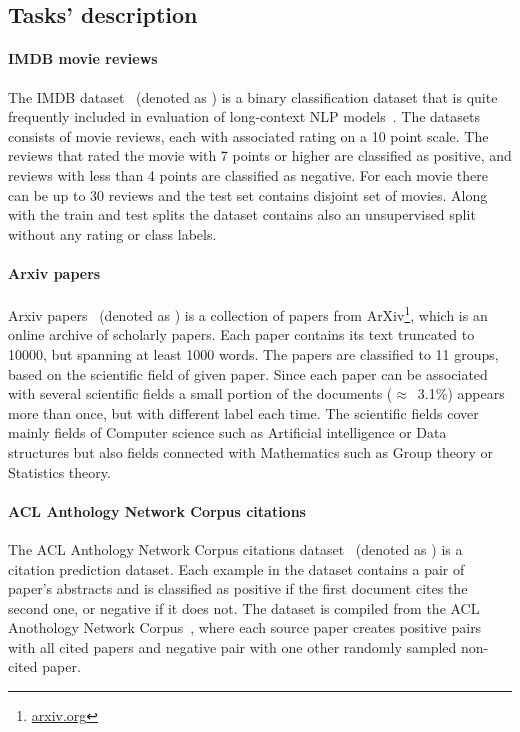 \subsection{Tasks' description}

\paragraph{IMDB movie reviews} The IMDB dataset~\citep{maas2011learning}
(denoted as ) is a binary classification dataset that is quite
frequently included in evaluation of long-context NLP
models~\citep{zaheer2020big, beltagy2020longformer, le2014distributed}. The
datasets consists of movie reviews, each with associated rating on a 10 point
scale. The reviews that rated the movie with 7 points or higher are classified
as positive, and reviews with less than 4 points are classified as negative.
For each movie there can be up to 30 reviews and the test set contains disjoint
set of movies. Along with the train and test splits the dataset contains also
an unsupervised split without any rating or class labels.

\paragraph{Arxiv papers} Arxiv papers~\citep{arxiv_papers} (denoted as
) is a collection of papers from ArXiv\footnote{\url{arxiv.org}},
which is an online archive of scholarly papers. Each paper contains its text
truncated to 10000, but spanning at least 1000 words. The papers are classified
to 11 groups, based on the scientific field of given paper. Since each paper
can be associated with several scientific fields a small portion of the
documents ($\approx$~3.1\%) appears more than once, but with different label
each time. The scientific fields cover mainly fields of Computer science such
as Artificial intelligence or Data structures but also fields connected with
Mathematics such as Group theory or Statistics theory.

\paragraph{ACL Anthology Network Corpus citations} The ACL Anthology Network
Corpus citations dataset~\citep{zhou2020multilevel} (denoted as ) is
a citation prediction dataset. Each example in the dataset contains a pair of
paper's abstracts and is classified as positive if the first document cites the
second one, or negative if it does not. The dataset is compiled from the ACL
Anothology Network Corpus~\citep{radev2013acl}, where each source paper creates
positive pairs with all cited papers and negative pair with one other randomly
sampled non-cited paper.

